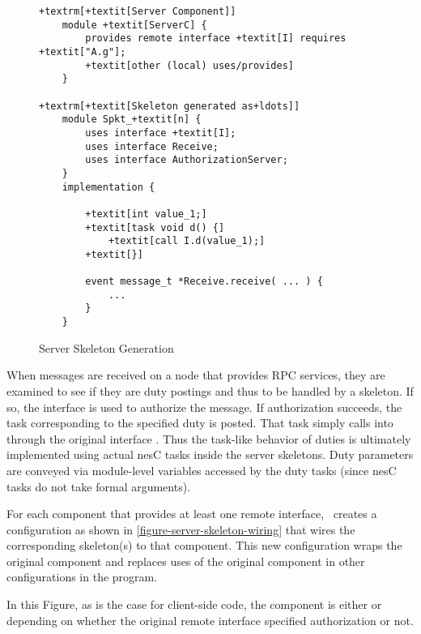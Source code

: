 \begin{figure}[!t]
\begin{textbox}{3.0in}
\begin{Verbatim}[commandchars=+\[\], fontsize=\small]
+textrm[+textit[Server Component]]
    module +textit[ServerC] {
        provides remote interface +textit[I] requires +textit["A.g"];
        +textit[other (local) uses/provides]
    }

+textrm[+textit[Skeleton generated as+ldots]]
    module Spkt_+textit[n] {
        uses interface +textit[I];
        uses interface Receive;
        uses interface AuthorizationServer;
    }
    implementation {

        +textit[int value_1;]
        +textit[task void d() {]
            +textit[call I.d(value_1);]
        +textit[}]

        event message_t *Receive.receive( ... ) {
            ...
        }
    }
\end{Verbatim}
\end{textbox}
\caption{Server Skeleton Generation}
\label{figure-server-skeleton-generation}
\end{figure}

When messages are received on a node that provides RPC services, they are examined to see if
they are duty postings and thus to be handled by a skeleton. If so, the
 interface is used to authorize the message. If authorization
succeeds, the task corresponding to the specified duty is posted. That task simply calls into
 through the original interface . Thus the task-like
behavior of duties is ultimately implemented using actual nesC tasks inside the server
skeletons. Duty parameters are conveyed via module-level variables accessed by the duty tasks
(since nesC tasks do not take formal arguments).

For each component that provides at least one remote interface, \Sprocket\ creates a
configuration as shown in \autoref{figure-server-skeleton-wiring} that wires the corresponding
skeleton(s) to that component. This new configuration wraps the original component and replaces
uses of the original component in other configurations in the program.

In this Figure, as is the case for client-side code, the  component
is either  or  depending on whether the original remote interface
specified authorization or not.


